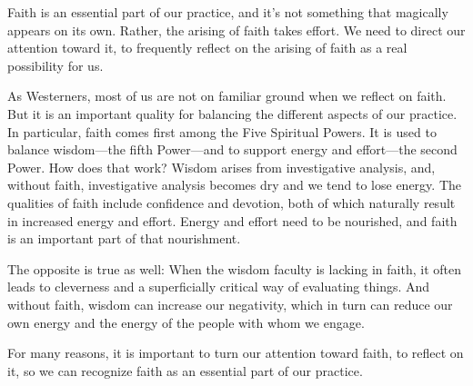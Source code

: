 
Faith is an essential part of our practice, and it's not something that 
magically appears on its own. Rather, the arising of faith takes 
effort. We need to direct our attention toward it, to frequently 
reflect on the arising of faith as a real possibility for us.

As Westerners, most of us are not on familiar ground when we reflect on 
faith. But it is an important quality for balancing the different 
aspects of our practice. In particular, faith comes first among the 
Five Spiritual Powers. It is used to balance wisdom---the fifth 
Power---and to support energy and effort---the second Power. How does 
that work? Wisdom arises from investigative analysis, and, without 
faith, investigative analysis becomes dry and we tend to lose energy. 
The qualities of faith include confidence and devotion, both of which 
naturally result in increased energy and effort. Energy and effort need 
to be nourished, and faith is an important part of that nourishment.

The opposite is true as well: When the wisdom faculty is lacking in 
faith, it often leads to cleverness and a superficially critical way of 
evaluating things. And without faith, wisdom can increase our 
negativity, which in turn can reduce our own energy and the energy of 
the people with whom we engage.

For many reasons, it is important to turn our attention toward faith, 
to reflect on it, so we can recognize faith as an essential part of our 
practice.

